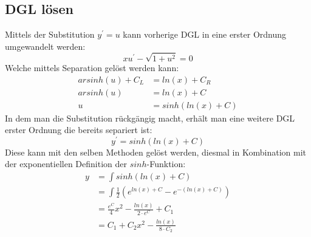 \subsection{DGL lösen
	\label{lambertw:subsection:DGLloes}}
Mittels der Substitution \(y^{\prime} = u\) kann vorherige DGL in eine erster Ordnung umgewandelt werden:
\begin{equation*}
	xu^{\prime} - \sqrt{1+u^2}
	= 0
	\label{lambertw:DGLmitU}
\end{equation*}
Welche mittels Separation gelöst werden kann:
\begin{align*}
	arsinh(u) + C_L
	&=
	ln(x) + C_R \\
	arsinh(u)
	&=
	ln(x) + C \\
	u
	&=
	sinh(ln(x) + C)
\end{align*}
In dem man die Substitution rückgängig macht, erhält man eine weitere DGL erster Ordnung die bereits separiert ist:
\begin{equation}
	y^{\prime}
	=
	sinh(ln(x) + C)
\end{equation}
Diese kann mit den selben Methoden gelöst werden, diesmal in Kombination mit der exponentiellen Definition der \(sinh\)-Funktion:
\begin{align*}
	y
	&=
	\int sinh(ln(x) + C) \\
	&=
	\int \frac{1}{2} (e^{ln(x)+C} - e^{-(ln(x)+C)}) \\
	&=
	\frac{e^C}{4} x^2 - \frac{ln(x)}{2 \cdot e^C} + C_1 \\
	&=
	C_1 + C_2 x^2 - \frac{ln(x)}{8 \cdot C_2}
\end{align*}

